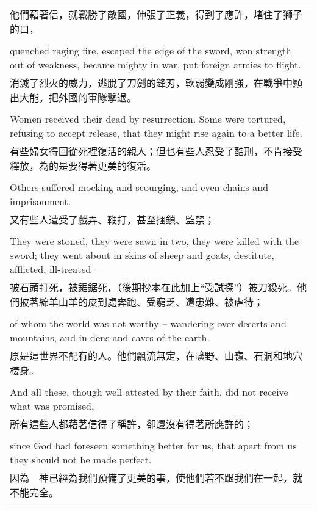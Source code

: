 \begin{tabularx}{\textwidth}{p{}}
他們藉著信，就戰勝了敵國，伸張了正義，得到了應許，堵住了獅子的口， \\ \\
quenched raging fire, escaped the edge of the sword, won strength out of weakness, became mighty in war, put foreign armies to flight. \\
消滅了烈火的威力，逃脫了刀劍的鋒刃，軟弱變成剛強，在戰爭中顯出大能，把外國的軍隊擊退。 \\ \\
Women received their dead by resurrection. Some were tortured, refusing to accept release, that they might rise again to a better life. \\
有些婦女得回從死裡復活的親人；但也有些人忍受了酷刑，不肯接受釋放，為的是要得著更美的復活。 \\ \\
Others suffered mocking and scourging, and even chains and imprisonment. \\
又有些人遭受了戲弄、鞭打，甚至捆鎖、監禁； \\ \\
They were stoned, they were sawn in two, they were killed with the sword; they went about in skins of sheep and goats, destitute, afflicted, ill-treated -- \\
被石頭打死，被鋸鋸死，（後期抄本在此加上“受試探”）被刀殺死。他們披著綿羊山羊的皮到處奔跑、受窮乏、遭患難、被虐待； \\ \\
of whom the world was not worthy -- wandering over deserts and mountains, and in dens and caves of the earth. \\
原是這世界不配有的人。他們飄流無定，在曠野、山嶺、石洞和地穴棲身。 \\ \\
And all these, though well attested by their faith, did not receive what was promised, \\
所有這些人都藉著信得了稱許，卻還沒有得著所應許的； \\ \\
since God had foreseen something better for us, that apart from us they should not be made perfect. \\
因為　神已經為我們預備了更美的事，使他們若不跟我們在一起，就不能完全。 \\ \\

\hline
\end{tabularx}

\newpage

